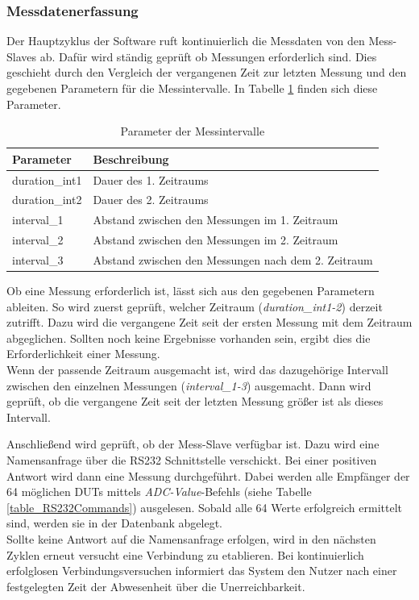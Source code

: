  
\subsubsection{Messdatenerfassung}

Der Hauptzyklus der Software ruft kontinuierlich die Messdaten von den Mess-Slaves ab. Dafür wird ständig geprüft ob Messungen erforderlich sind. Dies geschieht durch den Vergleich der vergangenen Zeit zur letzten Messung und den gegebenen Parametern für die Messintervalle. In Tabelle \ref{table_ParameterMessintervalle} finden sich diese Parameter.\\


\begin{table}[H]
\begin{center}
\begin{tabular}{|l|l|}\hline
Parameter & Beschreibung \\ \hline
duration\_int1 & Dauer des 1. Zeitraums\\  \hline
duration\_int2 & Dauer des 2. Zeitraums\\  \hline
interval\_1 & Abstand zwischen den Messungen im 1. Zeitraum\\  \hline
interval\_2 & Abstand zwischen den Messungen im 2. Zeitraum\\  \hline
interval\_3 & Abstand zwischen den Messungen nach dem 2. Zeitraum\\ \hline
\end{tabular}
\caption{Parameter der Messintervalle}
\label{table_ParameterMessintervalle}
\end{center}
\end{table}


Ob eine Messung erforderlich ist, lässt sich aus den gegebenen Parametern ableiten. So wird zuerst geprüft, welcher Zeitraum (\textit{duration\_int1-2}) derzeit zutrifft. Dazu wird die vergangene Zeit seit der ersten Messung mit dem Zeitraum abgeglichen. Sollten noch keine Ergebnisse vorhanden sein, ergibt dies die Erforderlichkeit einer Messung.\\ Wenn der passende Zeitraum ausgemacht ist, wird das dazugehörige Intervall zwischen den einzelnen Messungen (\textit{interval\_1-3}) ausgemacht. Dann wird geprüft, ob die vergangene Zeit seit der letzten Messung größer ist als dieses Intervall.\ 

Anschließend wird geprüft, ob der Mess-Slave verfügbar ist. Dazu wird eine Namensanfrage über die RS232 Schnittstelle verschickt. Bei einer positiven Antwort wird dann eine Messung durchgeführt. Dabei werden alle Empfänger der 64 möglichen \acp{DUT} mittels \textit{ADC-Value}-Befehls (siehe Tabelle \ref{table_RS232Commands}) ausgelesen. Sobald alle 64 Werte erfolgreich ermittelt sind, werden sie in der Datenbank abgelegt. \\
Sollte keine Antwort auf die Namensanfrage erfolgen, wird in den nächsten Zyklen erneut versucht eine Verbindung zu etablieren. Bei kontinuierlich erfolglosen Verbindungsversuchen informiert das System den Nutzer nach einer festgelegten Zeit der Abwesenheit über die Unerreichbarkeit.
 

